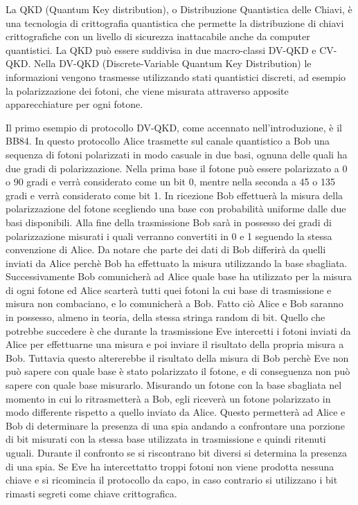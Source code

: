 La QKD (Quantum Key distribution), o Distribuzione Quantistica delle Chiavi, \`e una tecnologia di crittografia quantistica che permette la distribuzione di chiavi crittografiche con un livello di sicurezza inattacabile anche da computer quantistici. La QKD pu\`o essere suddivisa in due macro-classi DV-QKD e CV-QKD. Nella DV-QKD (Discrete-Variable Quantum Key Distribution) le informazioni vengono trasmesse utilizzando stati quantistici discreti, ad esempio la polarizzazione dei fotoni, che viene misurata attraverso apposite apparecchiature per ogni fotone. 

Il primo esempio di protocollo DV-QKD, come accennato nell'introduzione, \`e il BB84. In questo protocollo Alice trasmette sul canale quantistico a Bob una sequenza di fotoni polarizzati in modo casuale in due basi, ognuna delle quali ha due gradi di polarizzazione. Nella prima base il fotone pu\`o essere polarizzato a 0 o 90 gradi e verr\`a considerato come un bit 0, mentre nella seconda a 45 o 135 gradi e verr\`a considerato come bit 1.
In ricezione Bob effettuer\`a la misura della polarizzazione del fotone scegliendo una base con probabilit\`a uniforme dalle due basi disponibili. Alla fine della trasmissione Bob sar\`a in possesso dei gradi di polarizzazione misurati i quali verranno convertiti in 0 e 1 seguendo la stessa convenzione di Alice. Da notare che parte dei dati di Bob differir\`a da quelli inviati da Alice perch\`e Bob ha effettuato la misura utilizzando la base sbagliata.
Successivamente Bob comunicher\`a ad Alice quale base ha utilizzato per la misura di ogni fotone ed Alice scarter\`a tutti quei fotoni la cui base di trasmissione e misura non combaciano, e lo comunicher\`a a Bob. Fatto ci\`o Alice e Bob saranno in possesso, almeno in teoria, della stessa stringa random di bit.
Quello che potrebbe succedere \`e che durante la trasmissione Eve intercetti i fotoni inviati da Alice per effettuarne una misura e poi inviare il risultato della propria misura a Bob. Tuttavia questo altererebbe il risultato della misura di Bob perch\`e Eve non pu\`o sapere con quale base \`e stato polarizzato il fotone, e di conseguenza non pu\`o sapere con quale base misurarlo. Misurando un fotone con la base sbagliata nel momento in cui lo ritrasmetter\`a a Bob, egli ricever\`a un fotone polarizzato in modo differente rispetto a quello inviato da Alice. Questo permetter\`a ad Alice e Bob di determinare la presenza di una spia andando a confrontare una porzione di bit misurati con la stessa base utilizzata in trasmissione e quindi ritenuti uguali. Durante il confronto se si riscontrano bit diversi si determina la presenza di una spia. Se Eve ha intercettatto troppi fotoni non viene prodotta nessuna chiave e si ricomincia il protocollo da capo, in caso contrario si utilizzano i bit rimasti segreti come chiave crittografica\cite{zhao_development_2018}.

